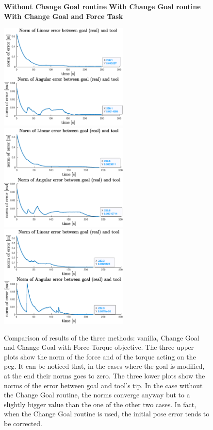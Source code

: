 \begin{figure}[H]
	\vspace{10px}
	\centerline{
		\hspace{5px}
		\textbf{Without Change Goal routine} 
		\hspace{35px}
		\textbf{With Change Goal routine}
		\hspace{25px}
		\textbf{With Change Goal and Force Task} 
	}
	\centerline{
		\includegraphics[width=6.5cm]{error_nothing/error.eps}
		\includegraphics[width=6.5cm]{error_goal/errorNorm.eps}
		\includegraphics[width=6.5cm]{error_all/errorNorm.eps}
	}
	\vspace{10px}
	\caption[Plots of comparisons with and without change goal and force objective]{Comparison of results of the three methods: vanilla, Change Goal and Change Goal with Force-Torque objective. The three upper plots show the norm of the force and of the torque acting on the peg. It can be noticed that, in the cases where the goal is modified, at the end their norms goes to zero. The three lower plots show the norms of the error between goal and tool's tip. In the case without the Change Goal routine, the norms converge anyway but to a slightly bigger value than the one of the other two cases. In fact, when the Change Goal routine is used, the initial pose error tends to be corrected.}
	\label{fig:comparison_final}
\end{figure}

